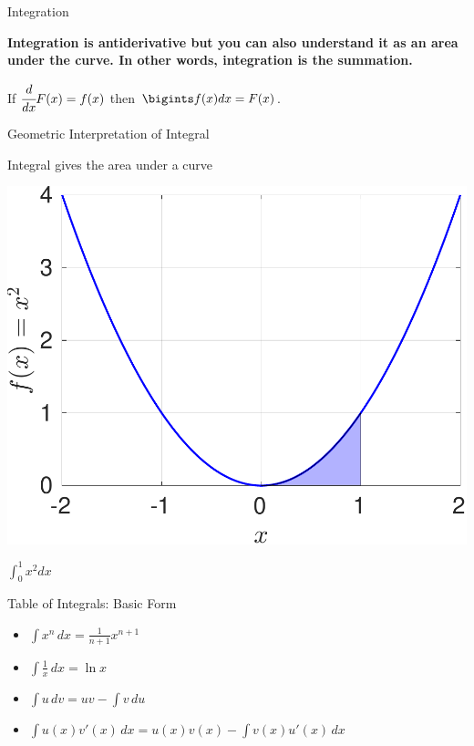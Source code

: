 \documentclass[aspectratio=169,xcolor=dvipsnames,svgnames,x11names,fleqn]{beamer}
\begin{document}
\begin{frame}{Integration}
\begin{center}
    \bf 
    Integration is antiderivative but you can also understand it as an area under the curve. In other words, integration is the summation.
\end{center}

If $\cfrac{d}{dx}F(x) = f(x)$ then $\bigints f(x) dx = F(x)$. 
    
\end{frame}

\begin{frame}{Geometric Interpretation of Integral}
    \begin{center}
        Integral gives the area under a curve
        
        \includegraphics[width=0.29\linewidth, trim=0cm 0cm 0cm 0cm,clip]{figures/integration.pdf}

        $\int_0^1 x^2 dx$
        
    \end{center}
    
\end{frame}


\begin{frame}{Table of Integrals: Basic Form}

\begin{itemize}
    \item $\int x^n \, dx = \frac{1}{n+1} x^{n+1}$
    \item $\int \frac{1}{x} \, dx = \ln x$
    \item $\int u \, dv = uv - \int v \, du$
    \item $\int u(x)v'(x) \, dx = u(x)v(x) - \int v(x)u'(x) \, dx$
\end{itemize}
    
\end{frame}
\end{document}
